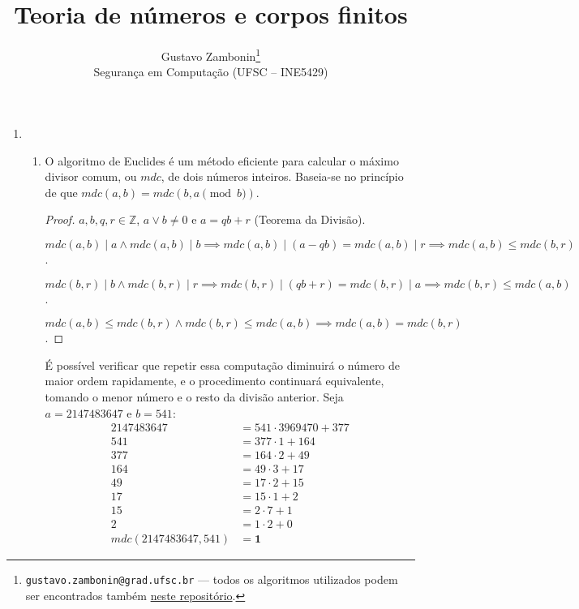 \documentclass[fleqn]{article}
\title{\textbf{Teoria de números e corpos finitos}}
\author{Gustavo Zambonin\thanks{\texttt{gustavo.zambonin@grad.ufsc.br} ---
todos os algoritmos utilizados podem ser encontrados
também \href{https://github.com/zambonin/ufsc-ine5429}{neste repositório}.} \\
\small {Segurança em Computação (UFSC -- INE5429)} \vspace{-5mm}}
\date{}
\begin{document}
\maketitle

\begin{enumerate}[label=\textbf{\arabic*})]

\item

\begin{enumerate}

\item O algoritmo de Euclides é um método eficiente para calcular o máximo
divisor comum, ou $mdc$, de dois números inteiros. Baseia-se no princípio de
que $mdc(a, b) = mdc(b, a \pmod{b})$.

\begin{proof}
$a, b, q, r \in \mathbb{Z}$, $a \lor b \neq 0$ e $a = qb + r$
(Teorema da Divisão).

$mdc(a, b) \mid a \land mdc(a, b) \mid b
\implies mdc(a, b) \mid (a - qb) = mdc(a, b) \mid r
\implies mdc(a, b) \leq mdc(b, r)$.

$mdc(b, r) \mid b \land mdc(b, r) \mid r
\implies mdc(b, r) \mid (qb + r) = mdc(b, r) \mid a
\implies mdc(b, r) \leq mdc(a, b)$.

$mdc(a, b) \leq mdc(b, r) \land mdc(b, r) \leq mdc(a, b)
\implies mdc(a, b) = mdc(b, r)$.
\end{proof}
É possível verificar que repetir essa computação diminuirá o número de maior
ordem rapidamente, e o procedimento continuará equivalente, tomando o menor
número e o resto da divisão anterior. Seja $a = 2147483647$ e $b = 541$:
\begin{align*}
2147483647 &= 541 \cdot 3969470 + 377 \\
541 &= 377 \cdot 1 + 164 \\
377 &= 164 \cdot 2 + 49 \\
164 &= 49 \cdot 3 + 17 \\
49 &= 17 \cdot 2 + 15 \\
17 &= 15 \cdot 1 + 2 \\
15 &= 2 \cdot 7 + 1 \\
2 &= 1 \cdot 2 + 0 \\
mdc(2147483647, 541) &= \boldsymbol{1}
\end{align*}


\end{enumerate}
\end{enumerate}
\end{document}
